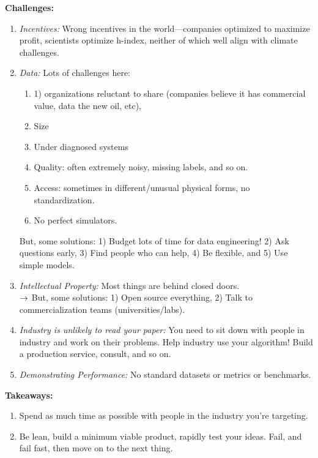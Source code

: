{\bf Challenges:}
\begin{enumerate}
    \item {\it Incentives:} Wrong incentives in the world---companies optimized to maximize profit, scientists optimize h-index, neither of which well align with climate challenges.
    \item {\it Data:} Lots of challenges here:
    \begin{enumerate}
        \item 1) organizations reluctant to share (companies believe it has commercial value, data the new oil, etc), 
        \item Size
        \item Under diagnosed systems
        \item Quality: often extremely noisy, missing labels, and so on.
        \item Access: sometimes in different/unusual physical forms, no standardization.
        \item No perfect simulators.
    \end{enumerate}
    
    But, some solutions: 1) Budget lots of time for data engineering! 2) Ask questions early, 3) Find people who can help, 4) Be flexible, and 5) Use simple models.
    
    \item {\it Intellectual Property:} Most things are behind closed doors. \\
    
    $\rightarrow$ But, some solutions: 1) Open source everything, 2) Talk to commercialization teams (universities/labs).
    
    \item {\it Industry is unlikely to read your paper:} You need to sit down with people in industry and work on their problems. Help industry use your algorithm! Build a production service, consult, and so on.
    
    \item {\it Demonstrating Performance:} No standard datasets or metrics or benchmarks.

    
\end{enumerate}


{\bf Takeaways:}
\begin{enumerate}
    \item Spend as much time as possible with people in the industry you're targeting.
    \item Be lean, build a minimum viable product, rapidly test your ideas. Fail, and fail fast, then move on to the next thing.
\end{enumerate}


